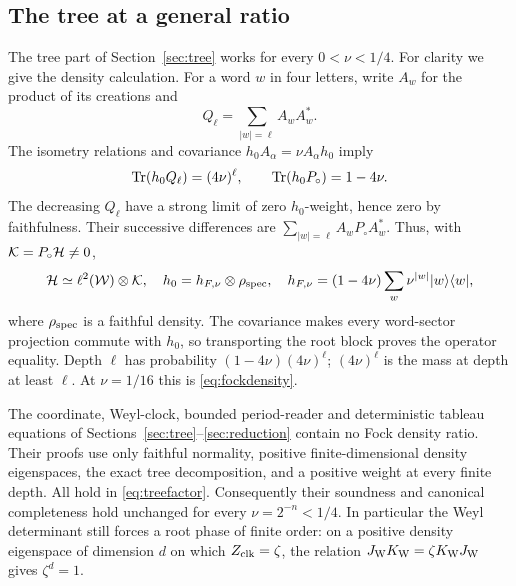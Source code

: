 \subsection{The tree at a general ratio}\label{sec:generaltree}
The tree part of Section~\ref{sec:tree} works for every $0<\nu<1/4$. For clarity we give the density calculation. For a word $w$ in four letters, write $A_w$ for the product of its creations and
\[
 Q_\ell=\sum_{|w|=\ell}A_wA_w^*.
\]
The isometry relations and covariance $h_0A_\alpha=\nu A_\alpha h_0$ imply
\[
 \operatorname{Tr}(h_0Q_\ell)=(4\nu)^\ell,\qquad
 \operatorname{Tr}(h_0P_\circ)=1-4\nu.
\]
The decreasing $Q_\ell$ have a strong limit of zero $h_0$-weight, hence zero by faithfulness. Their successive differences are $\sum_{|w|=\ell}A_wP_\circ A_w^*$. Thus, with $\mathcal K=P_\circ\mathcal H\ne0$,
\begin{equation}\label{eq:treefactor}
 \mathcal H\simeq\ell^2(\mathcal W)\otimes\mathcal K,\quad
 h_0=h_{F,\nu}\otimes\rho_{\rm spec},\quad
 h_{F,\nu}=(1-4\nu)\sum_w\nu^{|w|}|w\rangle\langle w|,
\end{equation}
where $\rho_{\rm spec}$ is a faithful density. The covariance makes every word-sector projection commute with $h_0$, so transporting the root block proves the operator equality. Depth $\ell$ has probability $(1-4\nu)(4\nu)^\ell$; $(4\nu)^\ell$ is the mass at depth at least $\ell$. At $\nu=1/16$ this is \eqref{eq:fockdensity}.

The coordinate, Weyl-clock, bounded period-reader and deterministic tableau equations of Sections~\ref{sec:tree}--\ref{sec:reduction} contain no Fock density ratio. Their proofs use only faithful normality, positive finite-dimensional density eigenspaces, the exact tree decomposition, and a positive weight at every finite depth. All hold in \eqref{eq:treefactor}. Consequently their soundness and canonical completeness hold unchanged for every $\nu=2^{-n}<1/4$. In particular the Weyl determinant still forces a root phase of finite order: on a positive density eigenspace of dimension $d$ on which $Z_{\rm clk}=\zeta$, the relation $J_{\rm W}K_{\rm W}=\zeta K_{\rm W}J_{\rm W}$ gives $\zeta^{d}=1$.

